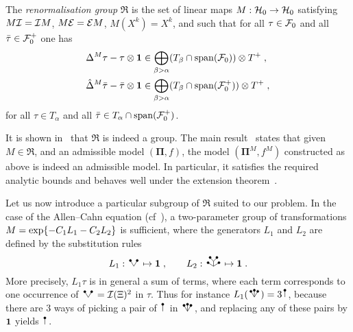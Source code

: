 \documentclass[reqno,11pt]{article}
\def\unit{\vone}
\def\bPi{\mathbf{\Pi}}
\DeclareMathOperator{\vspan}{span}
\begin{document}
\begin{definition}
\label{def:renorm_group}
The \emph{renormalisation group} $\mathfrak{R}$ is the set of linear maps
$M:{\mathcal H}_0\to{\mathcal H}_0$ satisfying $M{\mathcal I}={\mathcal I} M$, $M{\mathcal E}={\mathcal E} M$, $M(X^k)=X^k$, and such
that for all $\tau\in{\mathcal F}_0$ and all $\bar\tau\in{\mathcal F}_0^+$ one has 
\begin{align}
\nonumber
\Delta^M\tau - \tau\otimes\unit 
&\in \bigoplus_{\beta>\alpha}(T_\beta\cap\vspan(\cF_0))\otimes T^+\;, \\
\label{eq:def_RG} 
\hat\Delta^M\bar\tau - \bar\tau\otimes\unit 
&\in \bigoplus_{\beta>\alpha}(T_\beta\cap\vspan(\cF_0^+))\otimes T^+\;,
\end{align}
for all $\tau\in T_\alpha$ and all $\bar\tau\in T_\alpha\cap \vspan(\cF_0^+)$.
\end{definition}

It is shown in~\cite[Lemma~8.43]{Hairer2014} that $\mathfrak{R}$ is indeed
a group. The main result~\cite[Thm.~8.44]{Hairer2014} states that given
$M\in\mathfrak{R}$, and an admissible model $(\bPi,f)$, the model
$(\bPi^M,f^M)$ constructed as above is indeed an admissible
model. In particular, it satisfies the required analytic bounds and behaves well
under the extension theorem~\cite[Thm.~5.14]{Hairer2014}. 

Let us now introduce a particular subgroup of $\mathfrak{R}$ suited to our
problem. In the case of the Allen--Cahn equation
(cf~\cite[Sections~9.2 and~10.5]{Hairer2014}), a two-parameter group of
transformations $M=\exp\{-C_1L_1 -C_2L_2\}$ is sufficient, where the
generators $L_1$ and $L_2$ are defined by the substitution rules 
\begin{equation}
 L_1: \RSV \mapsto \unit\;, 
 \qquad
 L_2: \RSWV \mapsto \unit\;. 
 \label{eq:rn_substitutions} 
\end{equation}
More precisely, $L_1\tau$ is in general a sum of terms, where each term
corresponds to one occurrence of $\RSV=\cI(\Xi)^2$ in
$\tau$. Thus for instance $L_1(\RSW) = 3\RSI$, because there are $3$ ways of
picking a pair of $\RSI$ in $\RSW$, and replacing any of these pairs by $\unit$
yields $\RSI$.
\end{document}
